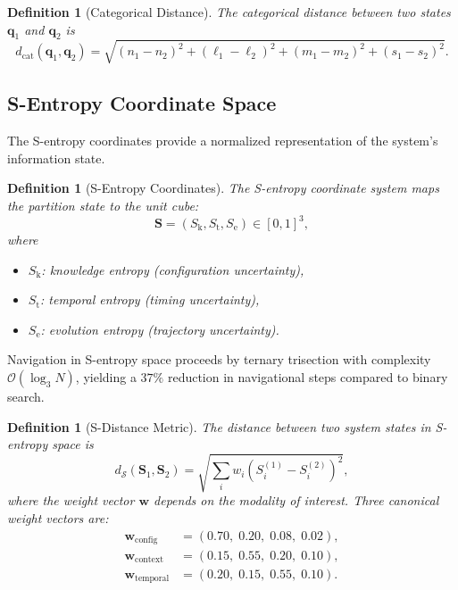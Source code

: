 \documentclass[twocolumn,10pt]{article}
\newtheorem{definition}[theorem]{Definition}
\newcommand{\Sk}{S_{\mathrm{k}}}
\newcommand{\St}{S_{\mathrm{t}}}
\newcommand{\Se}{S_{\mathrm{e}}}
\newcommand{\dcat}{d_{\mathrm{cat}}}
\begin{document}
\begin{definition}[Categorical Distance]
The categorical distance between two states $\mathbf{q}_{1}$ and $\mathbf{q}_{2}$ is
\begin{equation}
  \dcat(\mathbf{q}_{1}, \mathbf{q}_{2}) = \sqrt{(n_{1} - n_{2})^{2} + (\ell_{1} - \ell_{2})^{2} + (m_{1} - m_{2})^{2} + (s_{1} - s_{2})^{2}}.
  \label{eq:dcat}
\end{equation}
\end{definition}

\subsection{S-Entropy Coordinate Space}

The S-entropy coordinates provide a normalized representation of the system's information state.

\begin{definition}[S-Entropy Coordinates]
The S-entropy coordinate system maps the partition state to the unit cube:
\begin{equation}
  \mathbf{S} = (\Sk, \St, \Se) \in [0, 1]^{3},
  \label{eq:s_entropy}
\end{equation}
where
\begin{itemize}[nosep]
  \item $\Sk$: knowledge entropy (configuration uncertainty),
  \item $\St$: temporal entropy (timing uncertainty),
  \item $\Se$: evolution entropy (trajectory uncertainty).
\end{itemize}
\end{definition}

Navigation in S-entropy space proceeds by ternary trisection with complexity $\mathcal{O}(\log_{3} N)$, yielding a $37\%$ reduction in navigational steps compared to binary search.

\begin{definition}[S-Distance Metric]
The distance between two system states in S-entropy space is
\begin{equation}
  d_{\mathcal{S}}(\mathbf{S}_{1}, \mathbf{S}_{2}) = \sqrt{\sum_{i} w_{i} (S_{i}^{(1)} - S_{i}^{(2)})^{2}},
  \label{eq:s_distance}
\end{equation}
where the weight vector $\mathbf{w}$ depends on the modality of interest.  Three canonical weight vectors are:
\begin{align}
  \mathbf{w}_{\mathrm{config}} &= (0.70,\; 0.20,\; 0.08,\; 0.02), \label{eq:w_config}\\
  \mathbf{w}_{\mathrm{context}} &= (0.15,\; 0.55,\; 0.20,\; 0.10), \label{eq:w_context}\\
  \mathbf{w}_{\mathrm{temporal}} &= (0.20,\; 0.15,\; 0.55,\; 0.10). \label{eq:w_temporal}
\end{align}
\end{definition}
\end{document}
